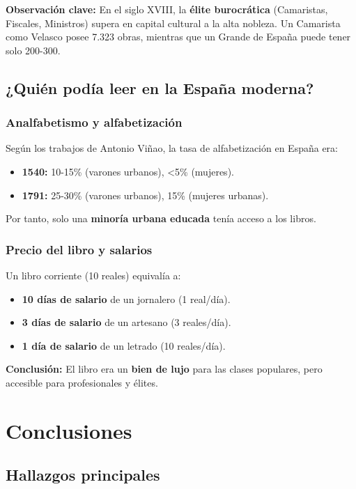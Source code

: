 \documentclass[12pt,a4paper]{article}
\begin{document}
\textbf{Observación clave:} En el siglo XVIII, la \textbf{élite burocrática} (Camaristas, Fiscales, Ministros) supera en capital cultural a la alta nobleza. Un Camarista como Velasco posee 7.323 obras, mientras que un Grande de España puede tener solo 200-300.

\subsection{¿Quién podía leer en la España moderna?}

\subsubsection{Analfabetismo y alfabetización}

Según los trabajos de Antonio Viñao, la tasa de alfabetización en España era:

\begin{itemize}
\item \textbf{1540:} 10-15\% (varones urbanos), <5\% (mujeres).
\item \textbf{1791:} 25-30\% (varones urbanos), 15\% (mujeres urbanas).
\end{itemize}

Por tanto, solo una \textbf{minoría urbana educada} tenía acceso a los libros.

\subsubsection{Precio del libro y salarios}

Un libro corriente (10 reales) equivalía a:

\begin{itemize}
\item \textbf{10 días de salario} de un jornalero (1 real/día).
\item \textbf{3 días de salario} de un artesano (3 reales/día).
\item \textbf{1 día de salario} de un letrado (10 reales/día).
\end{itemize}

\textbf{Conclusión:} El libro era un \textbf{bien de lujo} para las clases populares, pero accesible para profesionales y élites.

\section{Conclusiones}

\subsection{Hallazgos principales}
\end{document}
